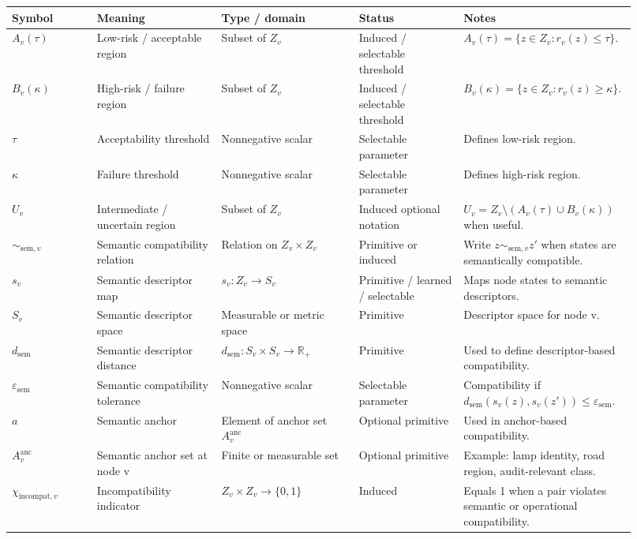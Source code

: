 \documentclass[11pt,a4paper]{article}
\begin{document}
\begin{landscape}
\begin{longtable}{@{}P{0.13\linewidth} P{0.19\linewidth} P{0.21\linewidth} P{0.16\linewidth} P{0.23\linewidth}@{}}
\midrule
\textbf{Symbol} & \textbf{Meaning} & \textbf{Type / domain} & \textbf{Status} & \textbf{Notes}\\
\midrule
\endhead
\bottomrule
\endfoot
\(A_v(\tau)\) & Low-risk / acceptable region & Subset of \(Z_v\) & Induced / selectable threshold & \(A_v(\tau)=\{z\in Z_v:r_v(z)\leq\tau\}\).\\
\(B_v(\kappa)\) & High-risk / failure region & Subset of \(Z_v\) & Induced / selectable threshold & \(B_v(\kappa)=\{z\in Z_v:r_v(z)\geq\kappa\}\).\\
\(\tau\) & Acceptability threshold & Nonnegative scalar & Selectable parameter & Defines low-risk region.\\
\(\kappa\) & Failure threshold & Nonnegative scalar & Selectable parameter & Defines high-risk region.\\
\(U_v\) & Intermediate / uncertain region & Subset of \(Z_v\) & Induced optional notation & \(U_v=Z_v\setminus(A_v(\tau)\cup B_v(\kappa))\) when useful.\\
\(\sim_{\mathrm{sem},v}\) & Semantic compatibility relation & Relation on \(Z_v\times Z_v\) & Primitive or induced & Write \(z\sim_{\mathrm{sem},v}z'\) when states are semantically compatible.\\
\(s_v\) & Semantic descriptor map & \(s_v:Z_v\to S_v\) & Primitive / learned / selectable & Maps node states to semantic descriptors.\\
\(S_v\) & Semantic descriptor space & Measurable or metric space & Primitive & Descriptor space for node v.\\
\(d_{\mathrm{sem}}\) & Semantic descriptor distance & \(d_{\mathrm{sem}}:S_v\times S_v\to\mathbb{R}_+\) & Primitive & Used to define descriptor-based compatibility.\\
\(\varepsilon_{\mathrm{sem}}\) & Semantic compatibility tolerance & Nonnegative scalar & Selectable parameter & Compatibility if \(d_{\mathrm{sem}}(s_v(z),s_v(z'))\leq\varepsilon_{\mathrm{sem}}\).\\
\(a\) & Semantic anchor & Element of anchor set \(A_v^{\mathrm{anc}}\) & Optional primitive & Used in anchor-based compatibility.\\
\(A_v^{\mathrm{anc}}\) & Semantic anchor set at node v & Finite or measurable set & Optional primitive & Example: lamp identity, road region, audit-relevant class.\\
\(\chi_{\mathrm{incompat},v}\) & Incompatibility indicator & \(Z_v\times Z_v\to\{0,1\}\) & Induced & Equals 1 when a pair violates semantic or operational compatibility.\\

\end{longtable}
\end{landscape}
\end{document}
